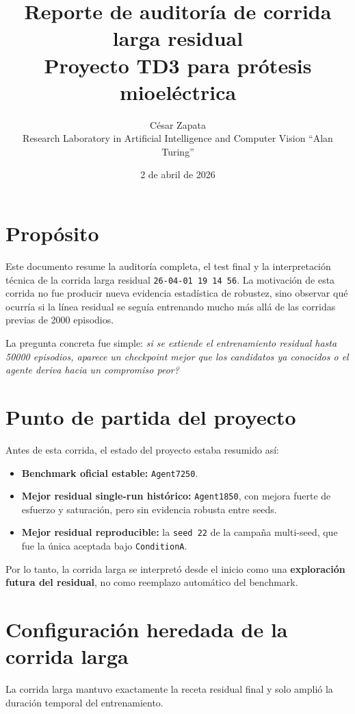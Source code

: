 \documentclass[11pt,a4paper]{article}
\title{Reporte de auditor\'ia de corrida larga residual\\\large Proyecto TD3 para pr\'otesis mioel\'ectrica}
\author{C\'esar Zapata\\Research Laboratory in Artificial Intelligence and Computer Vision ``Alan Turing''}
\date{2 de abril de 2026}
\begin{document}
\maketitle

\section*{Prop\'osito}
Este documento resume la auditor\'ia completa, el test final y la interpretaci\'on t\'ecnica de la corrida larga residual \texttt{26-04-01 19 14 56}. La motivaci\'on de esta corrida no fue producir nueva evidencia estad\'istica de robustez, sino observar qu\'e ocurr\'ia si la l\'inea residual se segu\'ia entrenando mucho m\'as all\'a de las corridas previas de 2000 episodios.

La pregunta concreta fue simple: \emph{si se extiende el entrenamiento residual hasta 50000 episodios, aparece un checkpoint mejor que los candidatos ya conocidos o el agente deriva hacia un compromiso peor?}

\section*{Punto de partida del proyecto}
Antes de esta corrida, el estado del proyecto estaba resumido as\'i:
\begin{itemize}
    \item \textbf{Benchmark oficial estable:} \texttt{Agent7250}.
    \item \textbf{Mejor residual single-run hist\'orico:} \texttt{Agent1850}, con mejora fuerte de esfuerzo y saturaci\'on, pero sin evidencia robusta entre seeds.
    \item \textbf{Mejor residual reproducible:} la \texttt{seed 22} de la campa\~na multi-seed, que fue la \'unica aceptada bajo \texttt{ConditionA}.
\end{itemize}

Por lo tanto, la corrida larga se interpret\'o desde el inicio como una \textbf{exploraci\'on futura del residual}, no como reemplazo autom\'atico del benchmark.

\section*{Configuraci\'on heredada de la corrida larga}
La corrida larga mantuvo exactamente la receta residual final y solo ampli\'o la duraci\'on temporal del entrenamiento.
\end{document}
